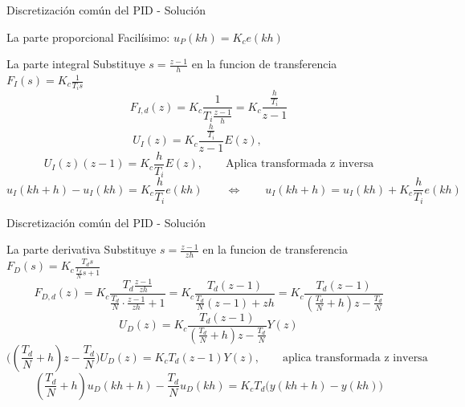 \documentclass[presentation,aspectratio=1610]{beamer}
\begin{document}
\begin{frame}[label={sec:org63a5a40}]{Discretización común del PID - Solución}
\begin{block}{La parte proporcional}
Facilísimo: \(u_P(kh) = K_c e(kh)\)
\end{block}
\begin{block}{La parte integral}
Substituye \(s = \frac{z-1}{h}\) en la funcion de transferencia \(F_I(s) = K_c \frac{1}{T_i s}\)
\[ F_{I,d}(z) = K_c\frac{1}{T_i \frac{z-1}{h}} = K_c \frac{\frac{h}{T_i}}{z-1}\]
\[U_I(z) = K_c \frac{\frac{h}{T_i}}{z-1} E(z), \qquad \text{}\]
\[U_I(z)(z-1) = K_c \frac{h}{T_i} E(z), \qquad \text{Aplica transformada z inversa}\]
\[ u_I(kh+h) - u_I(kh) = K_c \frac{h}{T_i} e(kh) \qquad \Leftrightarrow \qquad u_I(kh+h) = u_I(kh) + K_c\frac{h}{T_i} e(kh)\]
\end{block}
\end{frame}

\begin{frame}[label={sec:org931820e}]{Discretización común del PID - Solución}
\begin{block}{La parte derivativa}
Substituye \(s = \frac{z-1}{zh}\) en la funcion de transferencia \(F_D(s) = K_c \frac{T_d s}{\frac{T_d}{N} s + 1}\)
\[ F_{D,d}(z) = K_c\frac{T_d \frac{z-1}{zh}}{\frac{T_d}{N}\cdot\frac{z-1}{zh}+1} 
         = K_c \frac{T_d(z-1)}{\frac{T_d}{N}(z-1) + zh} 
= K_c \frac{T_d(z-1)}{(\frac{T_d}{N}+h)z -\frac{T_d}{N}} \]
\[ U_D(z) = K_c \frac{T_d(z-1)}{(\frac{T_d}{N}+h)z -\frac{T_d}{N}} Y(z)\]
\[ \Big((\frac{T_d}{N}+h)z -\frac{T_d}{N}\Big) U_D(z) = K_cT_d(z-1) Y(z), \qquad \text{aplica transformada z inversa} \]
\[ (\frac{T_d}{N}+h)u_D(kh+h) -\frac{T_d}{N}u_D(kh) = K_cT_d\big(y(kh+h) - y(kh)\big)\]
\end{block}
\end{frame}
\end{document}
